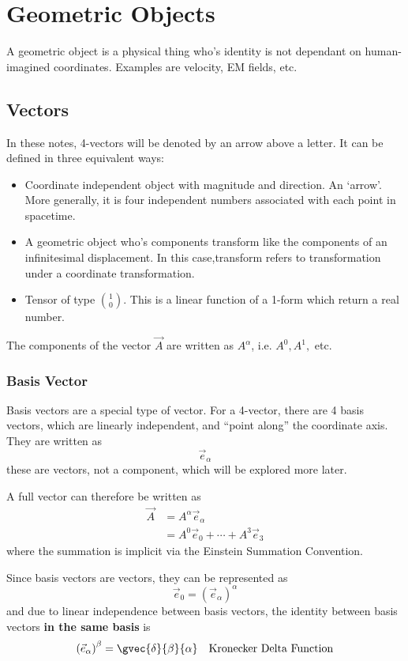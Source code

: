 \setchapterpreamble[u]{\margintoc}
\chapter{Geometric Objects}
A geometric object is a physical thing who's identity is not dependant on human-imagined coordinates. Examples are velocity, EM fields, etc.
\section{Vectors}
In these notes, 4-vectors will be denoted by an arrow above a letter. It can be defined in three equivalent ways:
\begin{itemize}
    \item Coordinate independent object with magnitude and direction. An `arrow'. More generally, it is four independent numbers associated with each point in spacetime.
    \item A geometric object who's components transform like the components of an infinitesimal displacement. In this case,transform refers to transformation under a coordinate transformation.
    \item Tensor of type $\binom{1}{0}$. This is a linear function of a 1-form which return a real number.
\end{itemize}
The components of the vector $\Vec{A}$ are written as $A^\alpha$, i.e. $A^0, A^1,$ etc.
\subsection{Basis Vector}
Basis vectors are a special type of vector. For a 4-vector, there are 4 basis vectors, which are linearly independent, and ``point along''  the coordinate axis. They are written as
$$ \vec{e}_\alpha $$
these are vectors, not a component, which  will be explored more later. \par A full vector can therefore be written as
\begin{align*}
    \vec{A} &= A^\alpha \vec{e}_\alpha \\ &= A^0 \vec{e}_0 + \cdots + A^3 \vec{e}_3
\end{align*}
where the summation is implicit via the Einstein Summation Convention. \par Since basis vectors are vectors, they can be represented as
$$ \vec{e}_0 = \left(\vec{e}_\alpha \right)^\alpha $$
and due to linear independence between basis vectors, the identity between basis vectors \textbf{in the same basis} is
$$ \left( \vec{e}_\alpha \right)^\beta = \gvec{\delta}{\beta}{\alpha}  \quad \text{Kronecker Delta Function} $$


